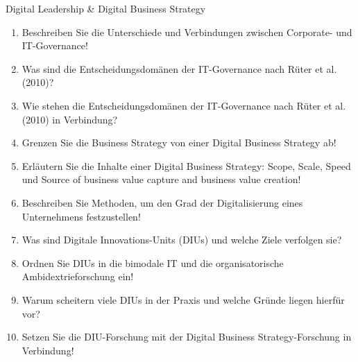 \documentclass{article}
\begin{document}
\begin{exercise}{Digital Leadership \& Digital Business Strategy}
  \begin{enumerate}
    \item Beschreiben Sie die Unterschiede und Verbindungen zwischen Corporate- und IT-Governance!
    \item Was sind die Entscheidungsdomänen der IT-Governance nach Rüter et al. (2010)?
    \item Wie stehen die Entscheidungsdomänen der IT-Governance nach Rüter et al. (2010) in Verbindung?
    \item Grenzen Sie die Business Strategy von einer Digital Business Strategy ab!
    \item Erläutern Sie die Inhalte einer Digital Business Strategy: Scope, Scale, Speed und Source of business value capture and business value creation!
    \item Beschreiben Sie Methoden, um den Grad der Digitalisierung eines Unternehmens festzustellen!
    \item Was sind Digitale Innovations-Units (DIUs) und welche Ziele verfolgen sie?
    \item Ordnen Sie DIUs in die bimodale IT und die organisatorische Ambidextrieforschung ein!
    \item Warum scheitern viele DIUs in der Praxis und welche Gründe liegen hierfür vor?
    \item Setzen Sie die DIU-Forschung mit der Digital Business Strategy-Forschung in Verbindung!
  \end{enumerate}


\end{exercise}
\end{document}
